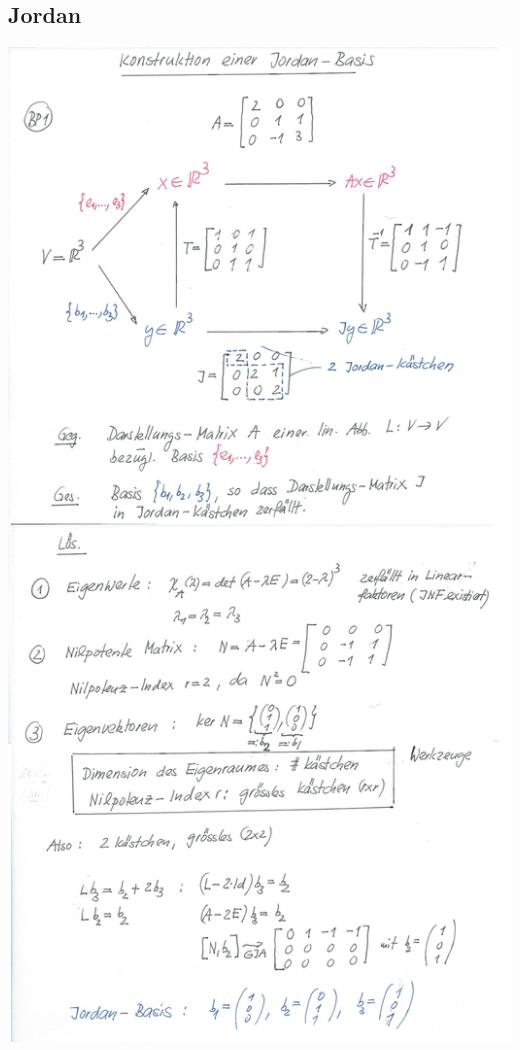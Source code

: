 \subsection{Jordan}
\begin{minipage}[h]{0.64\textwidth}
	\includegraphics[width=1.0\textwidth]{images/Jordan.png}
\end{minipage}
